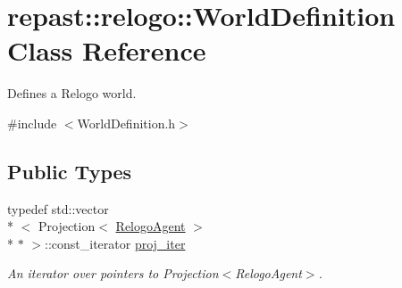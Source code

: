 \hypertarget{classrepast_1_1relogo_1_1_world_definition}{\section{repast\-:\-:relogo\-:\-:World\-Definition Class Reference}
\label{classrepast_1_1relogo_1_1_world_definition}
}


Defines a Relogo world.  




{\ttfamily \#include $<$World\-Definition.\-h$>$}

\subsection*{Public Types}
\begin{DoxyCompactItemize}
\item 
\hypertarget{classrepast_1_1relogo_1_1_world_definition_ab1e044b19b6cb8c2e00110e48882afcc}{typedef std\-::vector\\*
$<$ Projection$<$ \hyperlink{classrepast_1_1relogo_1_1_relogo_agent}{Relogo\-Agent} $>$\\*
 $\ast$ $>$\-::const\-\_\-iterator \hyperlink{classrepast_1_1relogo_1_1_world_definition_ab1e044b19b6cb8c2e00110e48882afcc}{proj\-\_\-iter}}\label{classrepast_1_1relogo_1_1_world_definition_ab1e044b19b6cb8c2e00110e48882afcc}

\begin{DoxyCompactList}\small\item\em An iterator over pointers to Projection$<$\-Relogo\-Agent$>$. \end{DoxyCompactList}\end{DoxyCompactItemize}
